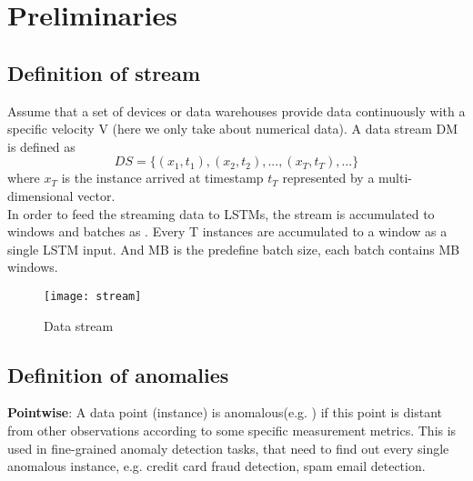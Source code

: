 \chapter{Preliminaries}
\label{chap:Preliminaries}

\section{Definition of stream}
\label{sec:Definition of stream}

Assume that a set of devices or data warehouses provide data continuously with a specific velocity V (here we only take about numerical data). A data stream DM is defined as 
\begin{equation} \label{eq:DS}
DS = \{(x_1,t_1),(x_2,t_2), ... , (x_T,t_T), ...\}
\end{equation}
where \textbf{$x_T$} is the instance arrived at timestamp \textbf{$t_T$} represented by a multi-dimensional vector.\\

In order to feed the streaming data to LSTMs, the stream is accumulated to windows and batches as . Every T instances are accumulated to a window as a single LSTM input. And MB is the predefine batch size, each batch contains MB windows.

\begin{figure}[h]
\centering
\texttt{[image: stream]}
\caption[Data stream]{Data stream}
\label{fig:stream}
\end{figure}




\section{Definition of anomalies}
\label{sec:Definition of anomalies}

\textbf{Pointwise}: A data point (instance) is anomalous(e.g. ) if this point is distant from other observations according to some specific measurement metrics. This is used in fine-grained anomaly detection tasks, that need to find out every single anomalous instance, e.g. credit card fraud detection, spam email detection.\\


